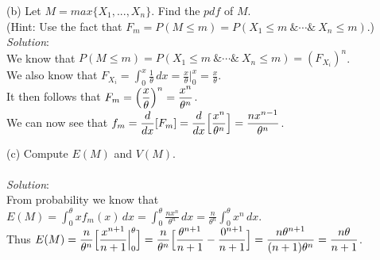 \documentclass[12pt]{article}
\begin{document}

(b) Let $ M = max\{X_{1},...,X_{n}\} $. Find the $ pdf $ of $ M $. \\
(Hint: Use the fact that $ F_{m} = P(M \leq m) = P(X_{1} \leq m \ \& \cdots \& \ X_{n} \leq m) $.)
\vspace{2.5mm} \\
\textit{Solution}:
\vspace{2.5mm} \\

\noindent
We know that $ P(M \leq m) = P(X_{1} \leq m \ \& \cdots \& \ X_{n} \leq m) = (F_{X_{i}})^{n} $. \\

\noindent
We also know that $ \displaystyle F_{X_{i}} = \int_{0}^{x} \frac{1}{\theta} \,dx = \frac{x}{\theta} \Big|_{0}^{x} = \frac{x}{\theta} $. \\

\noindent
It then follows that $ \displaystyle F_{m} = \Bigl( \frac{x}{\theta} \Bigr)^{n} = \frac{x^{n}}{\theta^{n}} $. \\

\noindent
We can now see that $ \displaystyle f_{m} = \frac{d}{dx}[F_{m}] = \frac{d}{dx} \Bigl[ \frac{x^{n}}{\theta^{n}} \Bigr] = \frac{nx^{n-1}}{\theta^{n}} $. \\
\newpage


(c) Compute $ E(M) $ and $ V(M) $. \\
\vspace{2.5mm} \\
\textit{Solution}:
\vspace{2.5mm} \\

\noindent
From probability we know that $ \displaystyle E(M) = \int_{0}^{\theta} xf_{m}(x) \, dx = \int_{0}^{\theta} \frac{nx^{n}}{\theta^{n}} \, dx = \frac{n}{\theta^{n}} \int_{0}^{\theta} x^{n} \, dx $. \\

\noindent
Thus $ \displaystyle E(M) = \frac{n}{\theta^{n}} \Bigl[ \frac{x^{n + 1}}{n + 1} \Big|_{0}^{\theta} \Bigr] = \frac{n}{\theta^{n}} \Bigl[ \frac{\theta^{n + 1}}{n + 1} - \frac{0^{n + 1}}{n + 1} \Bigr] = \frac{n\theta^{n + 1}}{(n + 1)\theta^{n}} = \frac{n\theta}{n + 1} $. \\
\end{document}
